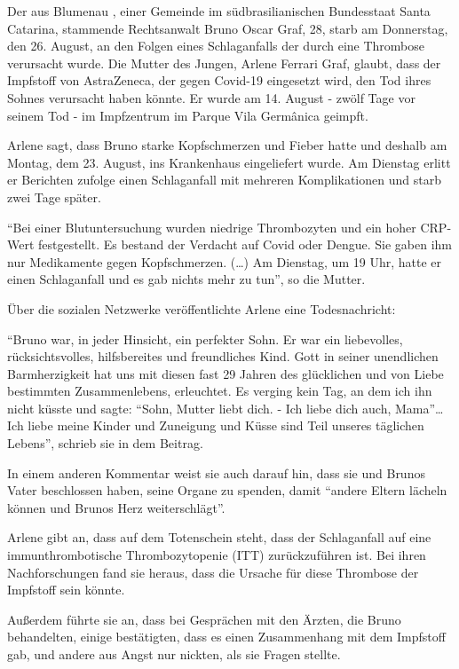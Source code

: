 Der aus Blumenau , einer Gemeinde im südbrasilianischen Bundesstaat Santa
Catarina, stammende Rechtsanwalt Bruno Oscar Graf, 28, starb am Donnerstag, den
26. August, an den Folgen eines Schlaganfalls der durch eine Thrombose
verursacht wurde. Die Mutter des Jungen, Arlene Ferrari Graf, glaubt, dass der
Impfstoff von AstraZeneca, der gegen Covid-19 eingesetzt wird, den Tod ihres
Sohnes verursacht haben könnte. Er wurde am 14. August - zwölf Tage vor seinem
Tod - im Impfzentrum im Parque Vila Germânica geimpft.

Arlene sagt, dass Bruno starke Kopfschmerzen und Fieber hatte und deshalb am
Montag, dem 23. August, ins Krankenhaus eingeliefert wurde. Am Dienstag erlitt
er Berichten zufolge einen Schlaganfall mit mehreren Komplikationen und starb
zwei Tage später.

“Bei einer Blutuntersuchung wurden niedrige Thrombozyten und ein hoher CRP-Wert
festgestellt. Es bestand der Verdacht auf Covid oder Dengue. Sie gaben ihm nur
Medikamente gegen Kopfschmerzen. (…) Am Dienstag, um 19 Uhr, hatte er einen
Schlaganfall und es gab nichts mehr zu tun”, so die Mutter.

Über die sozialen Netzwerke veröffentlichte Arlene eine Todesnachricht:

“Bruno war, in jeder Hinsicht, ein perfekter Sohn. Er war ein liebevolles,
rücksichtsvolles, hilfsbereites und freundliches Kind. Gott in seiner
unendlichen Barmherzigkeit hat uns mit diesen fast 29 Jahren des glücklichen und
von Liebe bestimmten Zusammenlebens, erleuchtet. Es verging kein Tag, an dem ich
ihn nicht küsste und sagte: “Sohn, Mutter liebt dich. - Ich liebe dich auch,
Mama”… Ich liebe meine Kinder und Zuneigung und Küsse sind Teil unseres
täglichen Lebens”, schrieb sie in dem Beitrag.

In einem anderen Kommentar weist sie auch darauf hin, dass sie und Brunos Vater
beschlossen haben, seine Organe zu spenden, damit “andere Eltern lächeln können
und Brunos Herz weiterschlägt”.

Arlene gibt an, dass auf dem Totenschein steht, dass der Schlaganfall auf eine
immunthrombotische Thrombozytopenie (ITT) zurückzuführen ist. Bei ihren
Nachforschungen fand sie heraus, dass die Ursache für diese Thrombose der
Impfstoff sein könnte.

Außerdem führte sie an, dass bei Gesprächen mit den Ärzten, die Bruno
behandelten, einige bestätigten, dass es einen Zusammenhang mit dem Impfstoff
gab, und andere aus Angst nur nickten, als sie Fragen stellte.

